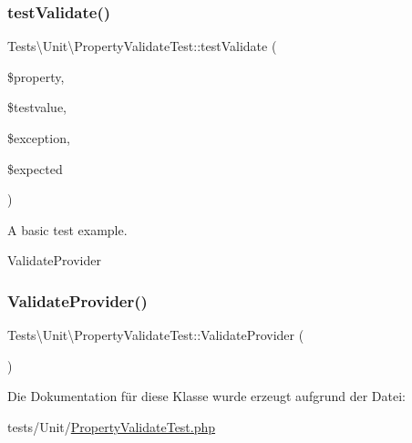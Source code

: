 \mbox{\label{classTests_1_1Unit_1_1PropertyValidateTest_a0d03245c41f91908da1ed130477c09d6}} 
\subsubsection{\texorpdfstring{test\+Validate()}{testValidate()}}
{\footnotesize\ttfamily Tests\textbackslash{}\+Unit\textbackslash{}\+Property\+Validate\+Test\+::test\+Validate (\begin{DoxyParamCaption}\item[{}]{\$property,  }\item[{}]{\$testvalue,  }\item[{}]{\$exception,  }\item[{}]{\$expected }\end{DoxyParamCaption})}

A basic test example.

Validate\+Provider \mbox{\label{classTests_1_1Unit_1_1PropertyValidateTest_acf5241cb7ddb78585d2f657cff2b451d}} 
\subsubsection{\texorpdfstring{Validate\+Provider()}{ValidateProvider()}}
{\footnotesize\ttfamily Tests\textbackslash{}\+Unit\textbackslash{}\+Property\+Validate\+Test\+::\+Validate\+Provider (\begin{DoxyParamCaption}{ }\end{DoxyParamCaption})}



Die Dokumentation für diese Klasse wurde erzeugt aufgrund der Datei\+:\begin{DoxyCompactItemize}
\item 
tests/\+Unit/\hyperlink{PropertyValidateTest_8php}{Property\+Validate\+Test.\+php}\end{DoxyCompactItemize}
